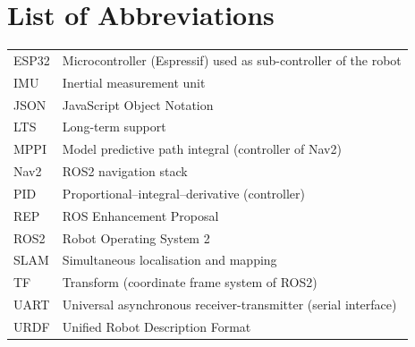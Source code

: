 \chapter*{List of Abbreviations}
\thispagestyle{fancy}

\begin{tabularx}{\textwidth}{@{}l X@{}}
  ESP32   & Microcontroller (Espressif) used as sub-controller of the robot \\
  IMU     & Inertial measurement unit \\
  JSON    & JavaScript Object Notation \\
  LTS     & Long-term support \\
  MPPI    & Model predictive path integral (controller of Nav2) \\
  Nav2    & ROS2 navigation stack \\
  PID     & Proportional--integral--derivative (controller) \\
  REP     & ROS Enhancement Proposal \\
  ROS2    & Robot Operating System 2 \\
  SLAM    & Simultaneous localisation and mapping \\
  TF      & Transform (coordinate frame system of ROS2) \\
  UART    & Universal asynchronous receiver-transmitter (serial interface) \\
  URDF    & Unified Robot Description Format \\
\end{tabularx}
